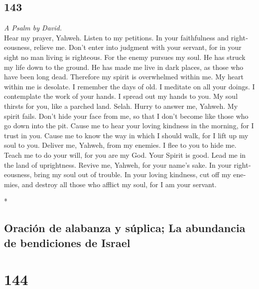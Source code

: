 \begin{paracol}{2}
\switchcolumn
\begin{otherlanguage}{english}

\hypertarget{section-285}{%
\section{143}\label{section-285}}

\emph{A Psalm by David.}\\
 Hear my prayer, Yahweh. Listen to my petitions. In your
faithfulness and righteousness, relieve me.  Don't enter
into judgment with your servant, for in your sight no man living is
righteous.  For the enemy pursues my soul. He has struck
my life down to the ground. He has made me live in dark places, as those
who have been long dead.  Therefore my spirit is
overwhelmed within me. My heart within me is desolate.  I
remember the days of old. I meditate on all your doings. I contemplate
the work of your hands.  I spread out my hands to you. My
soul thirsts for you, like a parched land. Selah.  Hurry
to answer me, Yahweh. My spirit fails. Don't hide your face from me, so
that I don't become like those who go down into the pit. 
Cause me to hear your loving kindness in the morning, for I trust in
you. Cause me to know the way in which I should walk, for I lift up my
soul to you.  Deliver me, Yahweh, from my enemies. I flee
to you to hide me.  Teach me to do your will, for you are
my God. Your Spirit is good. Lead me in the land of uprightness.
 Revive me, Yahweh, for your name's sake. In your
righteousness, bring my soul out of trouble.  In your
loving kindness, cut off my enemies, and destroy all those who afflict
my soul, for I am your servant.

\end{otherlanguage}

\switchcolumn[0]*

\hypertarget{oraciuxf3n-de-alabanza-y-suxfaplica-la-abundancia-de-bendiciones-de-israel}{%
\subsection{Oración de alabanza y súplica; La abundancia de bendiciones
de
Israel}\label{oraciuxf3n-de-alabanza-y-suxfaplica-la-abundancia-de-bendiciones-de-israel}}

\hypertarget{section-286}{%
\section{144}\label{section-286}}


\end{paracol}
